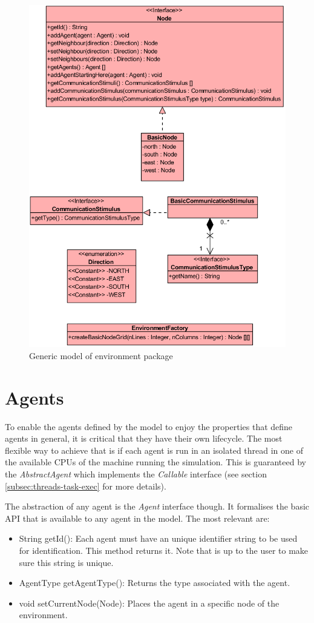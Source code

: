 \begin{figure}[H]
  \centering
  \includegraphics[width=0.8\linewidth]{gfx/uml-env-package.png}
  \caption{Generic model of environment package}
  \label{fig:gen-env-package}
\end{figure}

\section {Agents}
\label{sec:agents}

To enable the agents defined by the model to enjoy the properties that define agents in general, it is critical that they have their own lifecycle. The most flexible way to achieve that is if each agent is run in an isolated thread in one of the available CPUs of the machine running the simulation. This is guaranteed by the \emph{AbstractAgent} which implements the \emph{Callable} interface (see section \ref{subsec:threads-task-exec} for more details).  

The abstraction of any agent is the \emph{Agent} interface though. It formalises the basic \ac{API} that is available to any agent in the model. The most relevant are:

\begin{itemize}
  \item String getId(): Each agent must have an unique identifier string to be used for identification. This method returns it. Note that is up to the user to make sure this string is unique.
  
  \item AgentType getAgentType(): Returns the type associated with the agent.
  
  \item void setCurrentNode(Node): Places the agent in a specific node of the environment.
\end{itemize}

